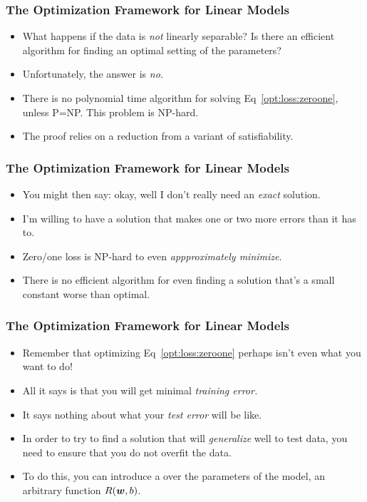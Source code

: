 \documentclass[trans]{beamer}
\begin{document}
\begin{frame}
  \frametitle{The Optimization Framework for Linear Models}
\begin{itemize}
\item 
What happens if the data is \emph{not} linearly
separable?  Is there an efficient algorithm for finding an optimal
setting of the parameters? 
\item Unfortunately, the answer is \emph{no.}
\item There is no polynomial time algorithm for solving
Eq~\eqref{opt:loss:zeroone}, unless P=NP.  This
problem is NP-hard.
\item  The proof  relies on a reduction from a
variant of satisfiability.
\end{itemize}
\end{frame}


\begin{frame}
  \frametitle{The Optimization Framework for Linear Models}
\begin{itemize}
\item 
You might then  say: okay, well I don't really need an
\emph{exact} solution.
\item   I'm willing to have a solution that makes one
or two more errors than it has to. 
\item  Zero/one loss is NP-hard to even \emph{appproximately
  minimize}.  
  \item There is no efficient algorithm for even
finding a solution that's a small constant worse than optimal.  
\end{itemize}
\end{frame}


\begin{frame}
  \frametitle{The Optimization Framework for Linear Models}
\begin{itemize}
\item 
Remember that optimizing
Eq~\eqref{opt:loss:zeroone} perhaps isn't even what you want to do!
\item All it says is that you will get minimal \emph{training
  error.}
\item   It says nothing about what your \emph{test error} will be
like.
\item  In order to try to find a solution that will \emph{generalize}
well to test data, you need to ensure that you do not overfit the
data.
\item  To do this, you can introduce a  over the
parameters of the model,  an arbitrary function
$R({\boldsymbol{w}},b)$.  
\end{itemize}
\end{frame}
\end{document}
